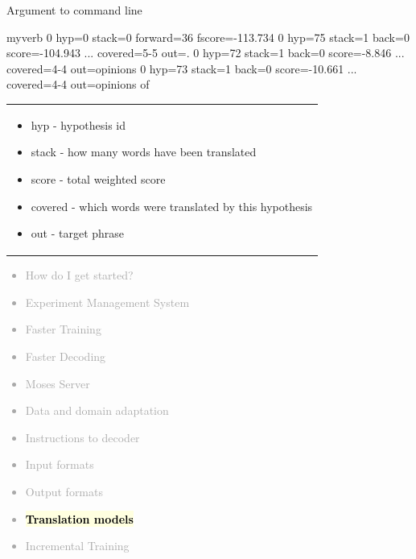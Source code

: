 \documentclass[landscape]{uedslides2C}
\newcommand{\currenttopic}[1]{\colorbox{lightyellow}{\textcolor{black}{\bf #1}}}
\begin{document}
\begin{center}
Argument to command line\\[2mm]
{\small \begin{SaveVerbatim}{myverb}
0 hyp=0 stack=0 forward=36 fscore=-113.734
0 hyp=75 stack=1 back=0 score=-104.943 ... covered=5-5 out=.
0 hyp=72 stack=1 back=0 score=-8.846 ... covered=4-4 out=opinions
0 hyp=73 stack=1 back=0 score=-10.661 ... covered=4-4 out=opinions of
\end{SaveVerbatim}
\colorbox{gray}{}

\vspace{-10mm}
\begin{tabular}{p{15cm}}
\begin{itemize} \itemsep -2mm
\item hyp - hypothesis id
\item  stack - how many words have been translated
\item score - total weighted score
\item covered - which words were translated by this hypothesis
\item out - target phrase
\end{itemize}
\end{tabular}}
\end{center}



\vspace{-5mm}
\textcolor{darkgrey}{
\small
\begin{itemize} \itemsep -1mm
\item {How do I get started?}
\item {Experiment Management System}
\item {Faster Training}
\item {Faster Decoding}
\item {Moses Server}
\item {Data and domain adaptation}
\item {Instructions to decoder}
\item {Input formats}
\item {Output formats}
\item \currenttopic{Translation models}
\item {Incremental Training}
\end{itemize}
}

\end{document}
